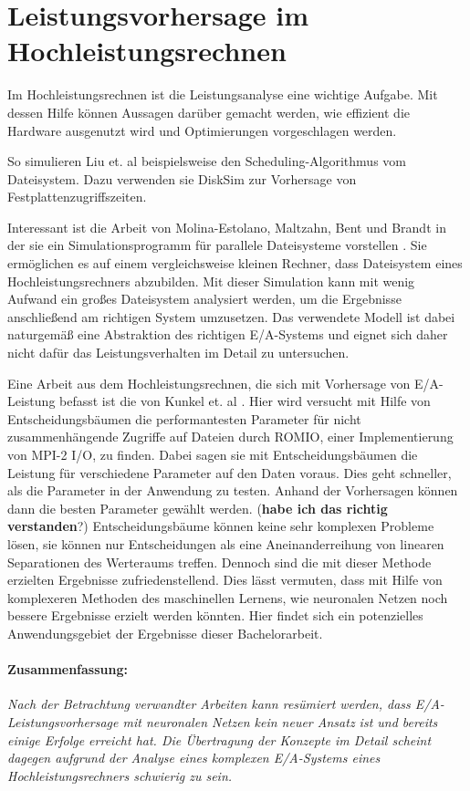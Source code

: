 \documentclass[
	12pt,
	a4paper,
	BCOR10mm,
	DIV14,
	listof=totoc,
	bibliography=totoc,
	headsepline
]{scrreprt}
\begin{document}
\section{Leistungsvorhersage im Hochleistungsrechnen}
\label{rel_vorhersage_im-hpc}
Im Hochleistungsrechnen ist die Leistungsanalyse eine wichtige Aufgabe. Mit dessen Hilfe können Aussagen darüber gemacht werden, wie effizient die Hardware ausgenutzt wird und Optimierungen vorgeschlagen werden. 

So simulieren Liu et. al \cite{liu2011towards} beispielsweise den Scheduling-Algorithmus vom Dateisystem. Dazu verwenden sie DiskSim \cite{Bucy08thedisksim} zur Vorhersage von Festplattenzugriffszeiten.

Interessant ist die Arbeit von Molina-Estolano, Maltzahn, Bent und Brandt in der sie ein Simulationsprogramm für parallele Dateisysteme vorstellen \cite{molina2009building}. Sie ermöglichen es auf einem vergleichsweise kleinen Rechner, dass Dateisystem eines Hochleistungsrechners abzubilden. Mit dieser Simulation kann mit wenig Aufwand ein großes Dateisystem analysiert werden, um die Ergebnisse anschließend am richtigen System umzusetzen. Das verwendete Modell ist dabei naturgemäß eine Abstraktion des richtigen E/A-Systems und eignet sich daher nicht dafür das Leistungsverhalten im Detail zu untersuchen.

Eine Arbeit aus dem Hochleistungsrechnen, die sich mit Vorhersage von E/A-Leistung befasst ist die von Kunkel et. al \cite{UMLTPTPONI15}. Hier wird versucht mit Hilfe von Entscheidungsbäumen die performantesten Parameter für nicht zusammenhängende Zugriffe auf Dateien durch ROMIO, einer Implementierung von MPI-2 I/O, zu finden.
Dabei sagen sie mit Entscheidungsbäumen die Leistung für verschiedene Parameter auf den Daten voraus. Dies geht schneller, als die Parameter in der Anwendung zu testen. Anhand der Vorhersagen können dann die besten Parameter gewählt werden. (\textbf{habe ich das richtig verstanden}?) 
Entscheidungsbäume können keine sehr komplexen Probleme lösen, sie können nur Entscheidungen als eine Aneinanderreihung von linearen Separationen des Werteraums treffen. Dennoch sind die mit dieser Methode erzielten Ergebnisse zufriedenstellend. Dies lässt vermuten, dass mit Hilfe von komplexeren Methoden des maschinellen Lernens, wie neuronalen Netzen noch bessere Ergebnisse erzielt werden könnten.
Hier findet sich ein potenzielles Anwendungsgebiet der Ergebnisse dieser Bachelorarbeit.

\paragraph{Zusammenfassung:}
\textit{
	Nach der Betrachtung verwandter Arbeiten kann resümiert werden, dass E/A-Leistungsvorhersage mit neuronalen Netzen kein neuer Ansatz ist und bereits einige Erfolge erreicht hat. Die Übertragung der Konzepte im Detail scheint dagegen aufgrund der Analyse eines komplexen E/A-Systems eines Hochleistungsrechners schwierig zu sein.
}
\end{document}
